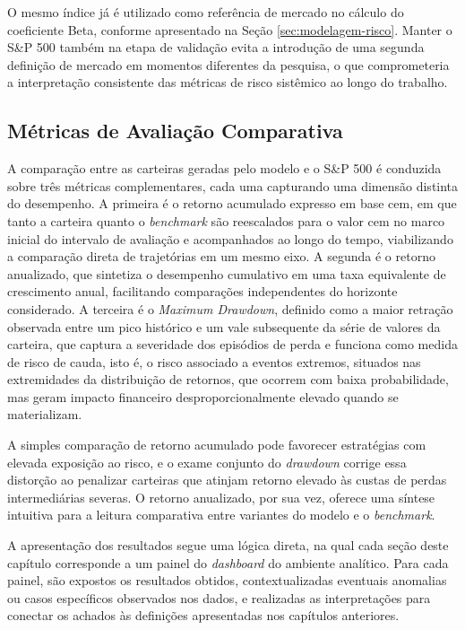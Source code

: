 O mesmo índice já é utilizado como referência de mercado no cálculo do coeficiente Beta, conforme apresentado na Seção \ref{sec:modelagem-risco}. Manter o S\&P 500 também na etapa de validação evita a introdução de uma segunda definição de mercado em momentos diferentes da pesquisa, o que comprometeria a interpretação consistente das métricas de risco sistêmico ao longo do trabalho.

\subsection{Métricas de Avaliação Comparativa}

A comparação entre as carteiras geradas pelo modelo e o S\&P 500 é conduzida sobre três métricas complementares, cada uma capturando uma dimensão distinta do desempenho. A primeira é o retorno acumulado expresso em base cem, em que tanto a carteira quanto o \textit{benchmark} são reescalados para o valor cem no marco inicial do intervalo de avaliação e acompanhados ao longo do tempo, viabilizando a comparação direta de trajetórias em um mesmo eixo. A segunda é o retorno anualizado, que sintetiza o desempenho cumulativo em uma taxa equivalente de crescimento anual, facilitando comparações independentes do horizonte considerado. A terceira é o \textit{Maximum Drawdown}, definido como a maior retração observada entre um pico histórico e um vale subsequente da série de valores da carteira, que captura a severidade dos episódios de perda e funciona como medida de risco de cauda, isto é, o risco associado a eventos extremos, situados nas extremidades da distribuição de retornos, que ocorrem com baixa probabilidade, mas geram impacto financeiro desproporcionalmente elevado quando se materializam.

A simples comparação de retorno acumulado pode favorecer estratégias com elevada exposição ao risco, e o exame conjunto do \textit{drawdown} corrige essa distorção ao penalizar carteiras que atinjam retorno elevado às custas de perdas intermediárias severas. O retorno anualizado, por sua vez, oferece uma síntese intuitiva para a leitura comparativa entre variantes do modelo e o \textit{benchmark}.

A apresentação dos resultados segue uma lógica direta, na qual cada seção deste capítulo corresponde a um painel do \textit{dashboard} do ambiente analítico. Para cada painel, são expostos os resultados obtidos, contextualizadas eventuais anomalias ou casos específicos observados nos dados, e realizadas as interpretações para conectar os achados às definições apresentadas nos capítulos anteriores.

